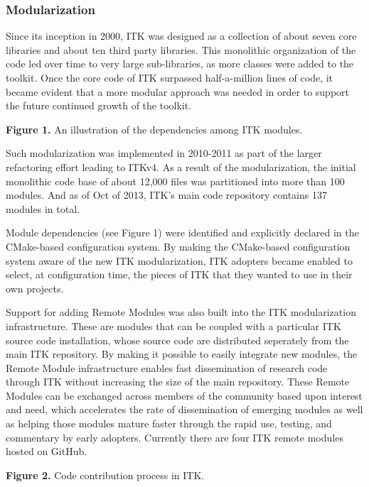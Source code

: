 \documentclass{frontiersENG} %
\begin{document}
\subsubsection{Modularization}

Since its inception in 2000, ITK was designed as a collection of about seven
core libraries and about ten third party libraries.  This monolithic
organization of the code led over time to very large sub-libraries, as more
classes were added to the toolkit. Once the core code of ITK surpassed
half-a-million lines of code, it became evident that a more modular approach
was needed in order to support the future continued growth of the toolkit.

\textbf{Figure 1. }{An illustration of the dependencies  among ITK modules.}\label{fig:01}

Such modularization was implemented in 2010-2011 as part of the larger
refactoring effort leading to ITKv4.  As a result of the modularization, the
initial monolithic code base of about 12,000 files was partitioned into more
than 100 modules.  And as of Oct of 2013, ITK's main code repository contains
137 modules in total.

Module dependencies (see Figure 1) were identified and explicitly declared in
the CMake-based \cite{CMake} configuration system. By making the CMake-based
configuration system aware of the new ITK modularization, ITK adopters became
enabled to select, at configuration time, the pieces of ITK that they wanted to
use in their own projects.

Support for adding Remote Modules was also built into the ITK modularization
infrastructure. These are modules that can be coupled with a particular
ITK source code installation, whose source code are distributed seperately from
the main ITK repository. By making it possible to easily integrate
new modules, the Remote Module infrastructure enables fast
dissemination of research code through ITK without increasing the size of the
main repository. These Remote Modules can be exchanged across members of the
community based upon interest and need, which accelerates the rate
of dissemination of emerging modules as well as helping those modules mature
faster through the rapid use, testing, and commentary by early adopters. Currently
there are four ITK remote modules hosted on GitHub.

\textbf{Figure 2. }{Code contribution process in ITK.}\label{fig:02}
\end{document}
